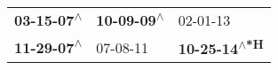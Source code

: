 \begin{supertabular}{lll}
 \textbf{03-15-07\textsuperscript{$\wedge$}} &  \textbf{10-09-09\textsuperscript{$\wedge$}} &                     02-01-13\textsuperscript{} \\
 \textbf{11-29-07\textsuperscript{$\wedge$}} &                   07-08-11\textsuperscript{} &  \textbf{10-25-14\textsuperscript{$\wedge$*H}} \\
\end{supertabular}
